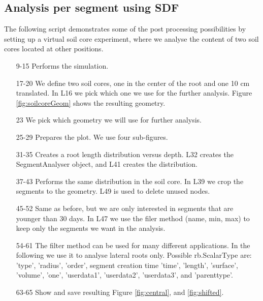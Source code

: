 \documentclass[a4paper]{article}
\begin{document}
\subsection{Analysis per segment using SDF}

The following script demonstrates some of the post processing possibilities by setting up a virtual soil core experiment, where we analyse the content of two soil cores located at other positions.



\begin{itemize}

\item[9-15] Performs the simulation.

\item[17-20] We define two soil cores, one in the center of the root and one 10 cm translated. In L16 we pick which one we use for the further analysis.  Figure \ref{fig:soilcoreGeom} shows the resulting geometry.

\item[23] We pick which geometry we will use for further analysis.

\item[25-29] Prepares the plot. We use four sub-figures. 

\item[31-35] Creates a root length distribution versus depth. L32 creates the SegmentAnalyser object, and L41 creates the distribution.

\item[37-43] Performs the same distribution in the soil core. In L39 we crop the segments to the geometry. L49 is used to delete unused nodes. 

\item[45-52] Same as before, but we are only interested in segments that are younger than 30 days. In L47 we use the filer method (name, min, max) to keep only the segments we want in the analysis. 

\item[54-61] The filter method can be used for many different applications. In the following we use it to analyse lateral roots only. Possible rb.ScalarType are: 'type', 'radius', 'order', segment creation time 'time', 'length', 'surface', 'volume', 'one', 'userdata1', 'userdata2', 'userdata3', and 'parenttype'.

\item[63-65] Show and save resulting Figure \ref{fig:central}, and \ref{fig:shifted}.

\end{itemize}
\end{document}
